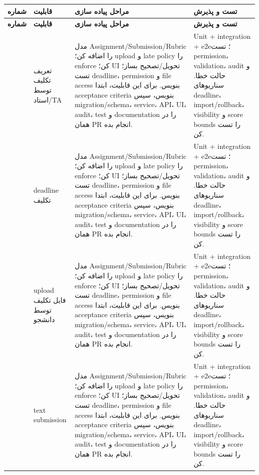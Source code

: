 \documentclass[11pt,a4paper]{article}
\begin{document}
\begin{longtable}{|>{\raggedleft\arraybackslash}p{}|>{\raggedleft\arraybackslash}p{}|>{\raggedleft\arraybackslash}p{}|>{\raggedleft\arraybackslash}p{}|}
\hline
\textbf{شماره} & \textbf{قابلیت} & \textbf{مراحل پیاده سازی} & \textbf{تست و پذیرش} \\\hline
\endfirsthead
\hline
\textbf{شماره} & \textbf{قابلیت} & \textbf{مراحل پیاده سازی} & \textbf{تست و پذیرش} \\\hline
\endhead
101 & تعریف تکلیف توسط استاد/TA & مدل Assignment/Submission/Rubric را اضافه کن؛ upload و late policy را enforce کن؛ UI تحویل/تصحیح بساز؛ تست deadline، permission و file access بنویس. برای این قابلیت، ابتدا acceptance criteria بنویس، سپس migration/schema، service، API، UI، audit، test و documentation را در همان PR انجام بده. & Unit + integration + e2e؛ تست permission، validation، audit و حالت خطا. سناریوهای deadline، import/rollback، visibility و score bounds را تست کن. \\ \hline
102 & deadline تکلیف & مدل Assignment/Submission/Rubric را اضافه کن؛ upload و late policy را enforce کن؛ UI تحویل/تصحیح بساز؛ تست deadline، permission و file access بنویس. برای این قابلیت، ابتدا acceptance criteria بنویس، سپس migration/schema، service، API، UI، audit، test و documentation را در همان PR انجام بده. & Unit + integration + e2e؛ تست permission، validation، audit و حالت خطا. سناریوهای deadline، import/rollback، visibility و score bounds را تست کن. \\ \hline
103 & upload فایل تکلیف توسط دانشجو & مدل Assignment/Submission/Rubric را اضافه کن؛ upload و late policy را enforce کن؛ UI تحویل/تصحیح بساز؛ تست deadline، permission و file access بنویس. برای این قابلیت، ابتدا acceptance criteria بنویس، سپس migration/schema، service، API، UI، audit، test و documentation را در همان PR انجام بده. & Unit + integration + e2e؛ تست permission، validation، audit و حالت خطا. سناریوهای deadline، import/rollback، visibility و score bounds را تست کن. \\ \hline
104 & text submission & مدل Assignment/Submission/Rubric را اضافه کن؛ upload و late policy را enforce کن؛ UI تحویل/تصحیح بساز؛ تست deadline، permission و file access بنویس. برای این قابلیت، ابتدا acceptance criteria بنویس، سپس migration/schema، service، API، UI، audit، test و documentation را در همان PR انجام بده. & Unit + integration + e2e؛ تست permission، validation، audit و حالت خطا. سناریوهای deadline، import/rollback، visibility و score bounds را تست کن. \\ \hline

\end{longtable}
\end{document}
